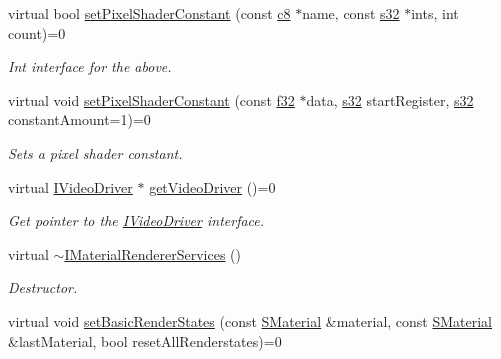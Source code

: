 \begin{DoxyCompactItemize}
\mbox{\label{classirr_1_1video_1_1IMaterialRendererServices_ac81171c7c59a9cf0fc7d76de910098f4}} 
virtual bool \hyperlink{classirr_1_1video_1_1IMaterialRendererServices_ac81171c7c59a9cf0fc7d76de910098f4}{set\+Pixel\+Shader\+Constant} (const \hyperlink{namespaceirr_a9395eaea339bcb546b319e9c96bf7410}{c8} $\ast$name, const \hyperlink{namespaceirr_ac66849b7a6ed16e30ebede579f9b47c6}{s32} $\ast$ints, int count)=0
\begin{DoxyCompactList}\small\item\em Int interface for the above. \end{DoxyCompactList}\item 
virtual void \hyperlink{classirr_1_1video_1_1IMaterialRendererServices_af962cb878f57d1edbc0030fedb464d1d}{set\+Pixel\+Shader\+Constant} (const \hyperlink{namespaceirr_a0277be98d67dc26ff93b1a6a1d086b07}{f32} $\ast$data, \hyperlink{namespaceirr_ac66849b7a6ed16e30ebede579f9b47c6}{s32} start\+Register, \hyperlink{namespaceirr_ac66849b7a6ed16e30ebede579f9b47c6}{s32} constant\+Amount=1)=0
\begin{DoxyCompactList}\small\item\em Sets a pixel shader constant. \end{DoxyCompactList}\item 
virtual \hyperlink{classirr_1_1video_1_1IVideoDriver}{I\+Video\+Driver} $\ast$ \hyperlink{classirr_1_1video_1_1IMaterialRendererServices_a2a80795887e43cb743eb5ee82604d4cf}{get\+Video\+Driver} ()=0
\begin{DoxyCompactList}\small\item\em Get pointer to the \hyperlink{classirr_1_1video_1_1IVideoDriver}{I\+Video\+Driver} interface. \end{DoxyCompactList}\item 
\mbox{\label{classirr_1_1video_1_1IMaterialRendererServices_abbab02366d5303f106d14278bf88aff3}} 
virtual \hyperlink{classirr_1_1video_1_1IMaterialRendererServices_abbab02366d5303f106d14278bf88aff3}{$\sim$\+I\+Material\+Renderer\+Services} ()
\begin{DoxyCompactList}\small\item\em Destructor. \end{DoxyCompactList}\item 
virtual void \hyperlink{classirr_1_1video_1_1IMaterialRendererServices_ab000e24fe3f65fb63b007a37895df3f2}{set\+Basic\+Render\+States} (const \hyperlink{classirr_1_1video_1_1SMaterial}{S\+Material} \&material, const \hyperlink{classirr_1_1video_1_1SMaterial}{S\+Material} \&last\+Material, bool reset\+All\+Renderstates)=0

\end{DoxyCompactItemize}
